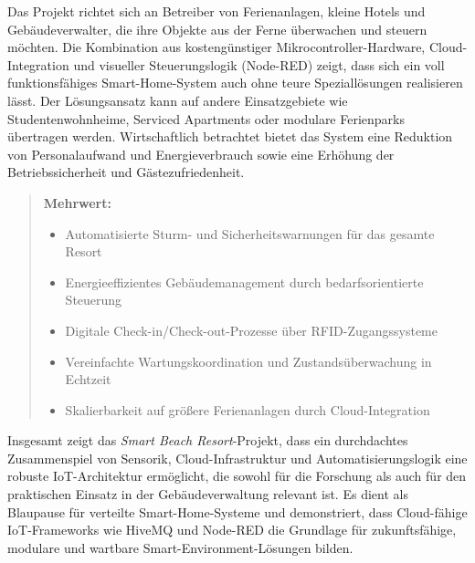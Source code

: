 Das Projekt richtet sich an Betreiber von Ferienanlagen, kleine Hotels und Gebäudeverwalter, die ihre Objekte aus der Ferne überwachen und steuern möchten. 
Die Kombination aus kostengünstiger Mikrocontroller-Hardware, Cloud-Integration und visueller Steuerungslogik (Node-RED) zeigt, dass sich ein voll funktionsfähiges Smart-Home-System auch ohne teure Speziallösungen realisieren lässt. 
Der Lösungsansatz kann auf andere Einsatzgebiete wie Studentenwohnheime, Serviced Apartments oder modulare Ferienparks übertragen werden. 
Wirtschaftlich betrachtet bietet das System eine Reduktion von Personalaufwand und Energieverbrauch sowie eine Erhöhung der Betriebssicherheit und Gästezufriedenheit.

\begin{quote}
	\textbf{Mehrwert:}
	\begin{itemize}[noitemsep]
		\item Automatisierte Sturm- und Sicherheitswarnungen für das gesamte Resort
		\item Energieeffizientes Gebäudemanagement durch bedarfsorientierte Steuerung
		\item Digitale Check-in/Check-out-Prozesse über RFID-Zugangssysteme
		\item Vereinfachte Wartungskoordination und Zustandsüberwachung in Echtzeit
		\item Skalierbarkeit auf größere Ferienanlagen durch Cloud-Integration
	\end{itemize}
\end{quote}

Insgesamt zeigt das \textit{Smart Beach Resort}-Projekt, dass ein durchdachtes Zusammenspiel von Sensorik, Cloud-Infrastruktur und Automatisierungslogik eine robuste IoT-Architektur ermöglicht, die sowohl für die Forschung als auch für den praktischen Einsatz in der Gebäudeverwaltung relevant ist. 
Es dient als Blaupause für verteilte Smart-Home-Systeme und demonstriert, dass Cloud-fähige IoT-Frameworks wie HiveMQ und Node-RED die Grundlage für zukunftsfähige, modulare und wartbare Smart-Environment-Lösungen bilden.
